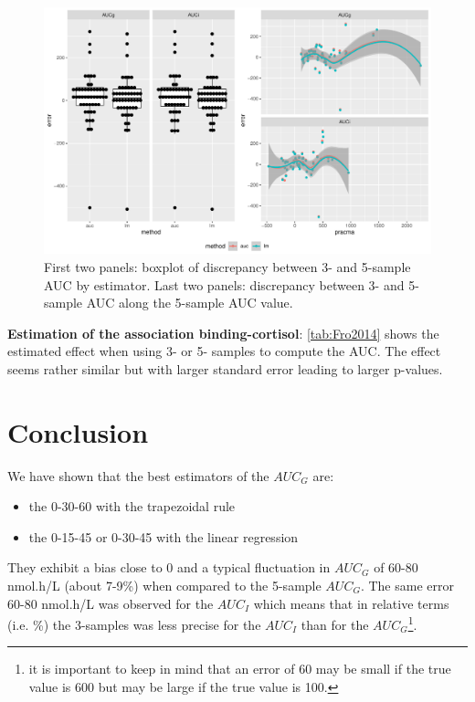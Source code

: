 \documentclass[12pt]{article}
\begin{document}
\begin{figure}[!h]
\centering
\includegraphics[width=1\textwidth]{./figures/gg-fro-errorAUC.pdf}
\caption{\label{fig:fro-errorAUC}First two panels: boxplot of discrepancy between 3- and 5-sample AUC by estimator. Last two panels: discrepancy between 3- and 5-sample AUC along the 5-sample AUC value.}
\end{figure}

\textbf{Estimation of the association binding-cortisol}: \autoref{tab:Fro2014}
shows the estimated effect when using 3- or 5- samples to compute the
AUC. The effect seems rather similar but with larger standard error
leading to larger p-values.

\clearpage

\section{Conclusion}
\label{sec:org5aa32ce}

We have shown that the best estimators of the \(AUC_G\) are:
\begin{itemize}
\item the 0-30-60 with the trapezoidal rule
\item the 0-15-45 or 0-30-45 with the linear regression
\end{itemize}
They exhibit a bias close to 0 and a typical fluctuation in \(AUC_G\)
of 60-80 nmol.h/L (about 7-9\%) when compared to the 5-sample
\(AUC_G\). The same error 60-80 nmol.h/L was observed for the
\(AUC_I\) which means that in relative terms (i.e. \%) the 3-samples
was less precise for the \(AUC_I\) than for the \(AUC_G\)\footnote{it is important to keep in mind that an error of 60 may be
small if the true value is 600 but may be large if the true value
is 100.}.
\end{document}
